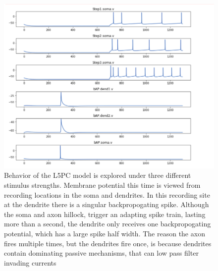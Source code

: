 \begin{figure}
    \centering
    \includegraphics{figures/l5pc_before_opt}
    \caption[Behavior of the L5PC model before optimization under default parameters]{Behavior of the L5PC model is explored under three different stimulus strengths. Membrane potential this time is viewed from recording locations in the soma and dendrites. In this recording site at the dendrite there is a singular backpropogating spike. Although the soma and axon hillock, trigger an adapting spike train, lasting more than a second, the dendrite only receives one backpropogating potential, which has a large spike half width. The reason the axon fires multiple times, but the dendrites fire once, is because  dendrites contain dominating passive mechanisms, that can low pass filter invading currents}
    \label{fig:my_label}
\end{figure}

